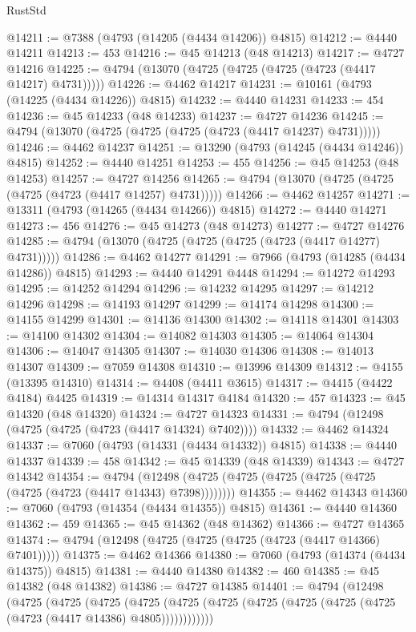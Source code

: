 \begin{lexlean}{RustStd}
\begin{coremodule}
@14211 := @7388 (@4793 (@14205 (@4434 @14206)) @4815)
@14212 := @4440 @14211
@14213 := 453
@14216 := @45 @14213 (@48 @14213)
@14217 := @4727 @14216
@14225 := @4794 (@13070 (@4725 (@4725 (@4725 (@4723 (@4417 @14217) @4731)))))
@14226 := @4462 @14217
@14231 := @10161 (@4793 (@14225 (@4434 @14226)) @4815)
@14232 := @4440 @14231
@14233 := 454
@14236 := @45 @14233 (@48 @14233)
@14237 := @4727 @14236
@14245 := @4794 (@13070 (@4725 (@4725 (@4725 (@4723 (@4417 @14237) @4731)))))
@14246 := @4462 @14237
@14251 := @13290 (@4793 (@14245 (@4434 @14246)) @4815)
@14252 := @4440 @14251
@14253 := 455
@14256 := @45 @14253 (@48 @14253)
@14257 := @4727 @14256
@14265 := @4794 (@13070 (@4725 (@4725 (@4725 (@4723 (@4417 @14257) @4731)))))
@14266 := @4462 @14257
@14271 := @13311 (@4793 (@14265 (@4434 @14266)) @4815)
@14272 := @4440 @14271
@14273 := 456
@14276 := @45 @14273 (@48 @14273)
@14277 := @4727 @14276
@14285 := @4794 (@13070 (@4725 (@4725 (@4725 (@4723 (@4417 @14277) @4731)))))
@14286 := @4462 @14277
@14291 := @7966 (@4793 (@14285 (@4434 @14286)) @4815)
@14293 := @4440 @14291 @4448
@14294 := @14272 @14293
@14295 := @14252 @14294
@14296 := @14232 @14295
@14297 := @14212 @14296
@14298 := @14193 @14297
@14299 := @14174 @14298
@14300 := @14155 @14299
@14301 := @14136 @14300
@14302 := @14118 @14301
@14303 := @14100 @14302
@14304 := @14082 @14303
@14305 := @14064 @14304
@14306 := @14047 @14305
@14307 := @14030 @14306
@14308 := @14013 @14307
@14309 := @7059 @14308
@14310 := @13996 @14309
@14312 := @4155 (@13395 @14310)
@14314 := @4408 (@4411 @3615)
@14317 := @4415 (@4422 @4184) @4425
@14319 := @14314 @14317 @4184
@14320 := 457
@14323 := @45 @14320 (@48 @14320)
@14324 := @4727 @14323
@14331 := @4794 (@12498 (@4725 (@4725 (@4723 (@4417 @14324) @7402))))
@14332 := @4462 @14324
@14337 := @7060 (@4793 (@14331 (@4434 @14332)) @4815)
@14338 := @4440 @14337
@14339 := 458
@14342 := @45 @14339 (@48 @14339)
@14343 := @4727 @14342
@14354 := @4794
    (@12498 (@4725 (@4725 (@4725 (@4725 (@4725 (@4725 (@4723 (@4417 @14343) @7398))))))))
@14355 := @4462 @14343
@14360 := @7060 (@4793 (@14354 (@4434 @14355)) @4815)
@14361 := @4440 @14360
@14362 := 459
@14365 := @45 @14362 (@48 @14362)
@14366 := @4727 @14365
@14374 := @4794 (@12498 (@4725 (@4725 (@4725 (@4723 (@4417 @14366) @7401)))))
@14375 := @4462 @14366
@14380 := @7060 (@4793 (@14374 (@4434 @14375)) @4815)
@14381 := @4440 @14380
@14382 := 460
@14385 := @45 @14382 (@48 @14382)
@14386 := @4727 @14385
@14401 := @4794
    (@12498
      (@4725
        (@4725
          (@4725
            (@4725 (@4725 (@4725 (@4725 (@4725 (@4725 (@4725 (@4723 (@4417 @14386) @4805))))))))))))

\end{coremodule}
\end{lexlean}
